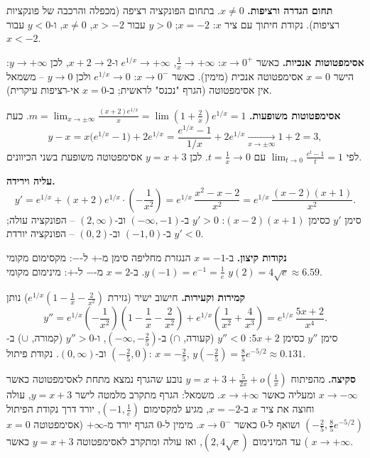\begin{solution}
\textbf{תחום הגדרה ורציפות.} $x\neq0$. בתחום הפונקציה רציפה (מכפלה והרכבה של פונקציות רציפות). נקודת חיתוך עם ציר $x$: $x=-2$; $y>0$ עבור $x>-2$, $x\ne0$, ו-$y<0$ עבור $x<-2$.

\textbf{אסימפטוטות אנכיות.} כאשר $x\to0^+$: $\frac1x\to+\infty$, $e^{1/x}\to+\infty$ ו-$x+2\to2$, לכן $y\to+\infty$: הישר $x=0$ אסימפטוטה אנכית (מימין). כאשר $x\to0^-$: $e^{1/x}\to0$ ולכן $y\to0$ – משמאל אין אסימפטוטה (הגרף "נכנס" לראשית; ב-$x=0$ אי-רציפות עיקרית).

\textbf{אסימפטוטות משופעות.} $m=\lim_{x\to\pm\infty}\frac{(x+2)e^{1/x}}{x}=\lim\left(1+\frac2x\right)e^{1/x}=1$. כעת
\[ y-x=x\big(e^{1/x}-1\big)+2e^{1/x}=\frac{e^{1/x}-1}{1/x}+2e^{1/x}\xrightarrow[x\to\pm\infty]{}1+2=3, \]
לפי $\lim_{t\to0}\frac{e^t-1}{t}=1$ עם $t=\frac1x\to0$. לכן $y=x+3$ אסימפטוטה משופעת בשני הכיוונים.

\textbf{עליה וירידה.}
\[ y'=e^{1/x}+(x+2)e^{1/x}\cdot\left(-\frac1{x^2}\right)=e^{1/x}\,\frac{x^2-x-2}{x^2}=e^{1/x}\,\frac{(x-2)(x+1)}{x^2}. \]
סימן $y'$ כסימן $(x-2)(x+1)$: $y'>0$ ב-$(-\infty,-1)$ וב-$(2,\infty)$ – הפונקציה עולה; $y'<0$ ב-$(-1,0)$ וב-$(0,2)$ – הפונקציה יורדת.

\textbf{נקודות קיצון.} ב-$x=-1$ הנגזרת מחליפה סימן מ-$+$ ל-$-$: מקסימום מקומי $y(-1)=e^{-1}=\frac1e$. ב-$x=2$ מ-$-$ ל-$+$: מינימום מקומי $y(2)=4\sqrt e\approx6.59$.

\textbf{קמירות וקעירות.} חישוב ישיר (גזירת $e^{1/x}(1-\frac1x-\frac2{x^2})$) נותן
\[ y''=e^{1/x}\left(-\frac1{x^2}\right)\left(1-\frac1x-\frac2{x^2}\right)+e^{1/x}\left(\frac1{x^2}+\frac4{x^3}\right)=e^{1/x}\,\frac{5x+2}{x^4}. \]
סימן $y''$ כסימן $5x+2$: $y''<0$ (קעורה, $\cap$) ב-$(-\infty,-\frac25)$, ו-$y''>0$ (קמורה, $\cup$) ב-$(-\frac25,0)$ וב-$(0,\infty)$. נקודת פיתול: $x=-\frac25$, $y\left(-\frac25\right)=\frac85e^{-5/2}\approx0.131$.

\textbf{סקיצה.} מהפיתוח $y=x+3+\frac{5}{2x}+o\!\left(\frac1x\right)$ נובע שהגרף נמצא מתחת לאסימפטוטה כאשר $x\to-\infty$ ומעליה כאשר $x\to+\infty$. משמאל: הגרף מתקרב מלמטה לישר $y=x+3$, עולה וחוצה את ציר $x$ ב-$x=-2$, מגיע למקסימום $(-1,\frac1e)$, יורד דרך נקודת הפיתול $(-\frac25,\frac85e^{-5/2})$ ושואף ל-$0$ כאשר $x\to0^-$. מימין ל-$0$ הגרף יורד מ-$+\infty$ (אסימפטוטה $x=0$) עד המינימום $(2,4\sqrt e)$, ואז עולה ומתקרב לאסימפטוטה $y=x+3$ כאשר $x\to+\infty$.
\end{solution}
